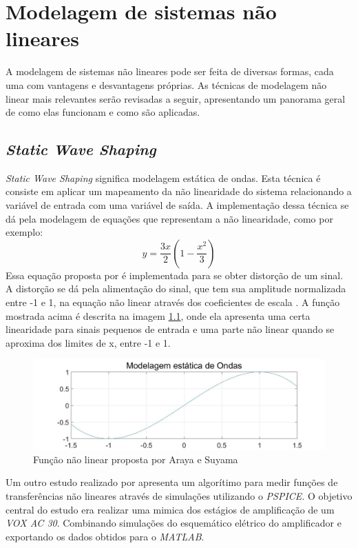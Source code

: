 
\chapter{Modelagem de sistemas não lineares}

A modelagem de sistemas não lineares pode ser feita de diversas formas, cada uma com vantagens e desvantagens próprias. As técnicas de modelagem não linear mais relevantes serão revisadas a seguir, apresentando um panorama geral de como elas funcionam e como são aplicadas.

\section*{\textit{Static Wave Shaping}}
\textit{Static Wave Shaping} significa modelagem estática de ondas. Esta técnica é consiste em aplicar um mapeamento da não linearidade do sistema relacionando a variável de entrada com uma variável de saída. A implementação dessa técnica se dá pela modelagem de equações que representam a não linearidade, como por exemplo:
\begin{equation}
y = \frac{3x}{2} (1 - \frac{{x^2}}{3})
\label{Equação1}
\end{equation}
Essa equação proposta por \cite{arayasuyama}  é implementada para se obter distorção de um sinal. A distorção se dá pela alimentação do sinal, que tem sua amplitude normalizada entre -1 e 1, na equação não linear através dos coeficientes de escala \cite{pakarinen2009review}. A função mostrada acima é descrita na imagem \ref{fig:staticwaveshaping}, onde ela apresenta uma certa linearidade para sinais pequenos de entrada e uma parte não linear quando se aproxima dos limites de x, entre -1 e 1.
\begin{figure}[htb!]
	\centering
	\includegraphics[width=0.7\linewidth]{figuras/StaticWaveShaping}
	\caption{Função não linear proposta por Araya e Suyama}
	\label{fig:staticwaveshaping}
\end{figure}

Um outro estudo realizado por \cite{moller2002measurement} apresenta um algorítimo para medir funções de transferências não lineares através de simulações utilizando o \textit{PSPICE}. O objetivo central do estudo era realizar uma mimica dos estágios de amplificação de um \textit{VOX AC 30}. Combinando simulações do esquemático elétrico do amplificador e exportando os dados obtidos para o \textit{MATLAB}.

